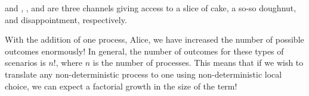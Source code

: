 and \sliceofcake, \doughnut, and \nope are three channels giving access to a
slice of cake, a so-so doughnut, and disappointment, respectively.
\begin{center}
\end{center}
With the addition of one process, Alice, we have increased the number of possible
outcomes enormously! In general, the number of outcomes for these types of
scenarios is $n!$, where $n$ is the number of processes. This means that if we
wish to translate any non-deterministic process to one using non-deterministic
local choice, we can expect a factorial growth in the size of the term!
